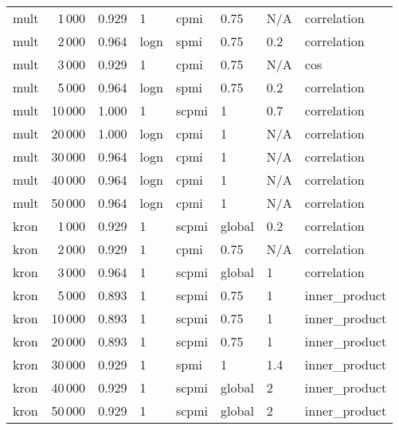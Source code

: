 \begin{tabular}{lrrlllll}
    mult &            1\,000 &      0.929 &     1 &   cpmi &    0.75 &  N/A &    correlation \\
    mult &            2\,000 &      0.964 &  logn &   spmi &    0.75 &  0.2 &    correlation \\
    mult &            3\,000 &      0.929 &     1 &   cpmi &    0.75 &  N/A &            cos \\
    mult &            5\,000 &      0.964 &  logn &   spmi &    0.75 &  0.2 &    correlation \\
    mult &           10\,000 &      1.000 &     1 &  scpmi &       1 &  0.7 &    correlation \\
    mult &           20\,000 &      1.000 &  logn &   cpmi &       1 &  N/A &    correlation \\
    mult &           30\,000 &      0.964 &  logn &   cpmi &       1 &  N/A &    correlation \\
    mult &           40\,000 &      0.964 &  logn &   cpmi &       1 &  N/A &    correlation \\
    mult &           50\,000 &      0.964 &  logn &   cpmi &       1 &  N/A &    correlation \\
    kron &            1\,000 &      0.929 &     1 &  scpmi &  global &  0.2 &    correlation \\
    kron &            2\,000 &      0.929 &     1 &   cpmi &    0.75 &  N/A &    correlation \\
    kron &            3\,000 &      0.964 &     1 &  scpmi &  global &    1 &    correlation \\
    kron &            5\,000 &      0.893 &     1 &  scpmi &    0.75 &    1 &  inner\_product \\
    kron &           10\,000 &      0.893 &     1 &  scpmi &    0.75 &    1 &  inner\_product \\
    kron &           20\,000 &      0.893 &     1 &  scpmi &    0.75 &    1 &  inner\_product \\
    kron &           30\,000 &      0.929 &     1 &   spmi &       1 &  1.4 &  inner\_product \\
    kron &           40\,000 &      0.929 &     1 &  scpmi &  global &    2 &  inner\_product \\
    kron &           50\,000 &      0.929 &     1 &  scpmi &  global &    2 &  inner\_product \\
\bottomrule
\end{tabular}

